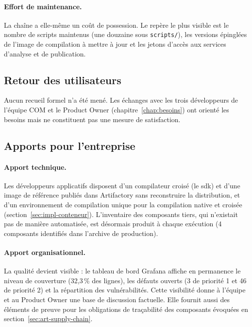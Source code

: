\paragraph{Effort de maintenance.} La chaîne a elle-même un coût de possession.
Le repère le plus visible est le nombre de scripts maintenus (une douzaine sous
\texttt{scripts/}), les versions épinglées de l'image de compilation à mettre
à jour et les jetons d'accès aux services d'analyse et de publication.

\subsection{Retour des utilisateurs}
\label{sec:eval-retour}

Aucun recueil formel n'a été mené. Les échanges avec les trois développeurs de
l'équipe COM et le Product Owner (chapitre~\ref{chap:besoins}) ont orienté les
besoins mais ne constituent pas une mesure de satisfaction.

\subsection{Apports pour l'entreprise}
\label{sec:eval-apports-entreprise}

\paragraph{Apport technique.} Les développeurs applicatifs disposent d'un
compilateur croisé (le \gls{sdk}) et d'une image de référence publiés dans
Artifactory sans reconstruire la distribution, et d'un environnement de
compilation unique pour la compilation native et croisée
(section~\ref{sec:impl-conteneur}). L'inventaire des composants tiers, qui
n'existait pas de manière automatisée, est désormais produit à chaque exécution
(4 composants identifiés dans l'archive de production).

\paragraph{Apport organisationnel.} La qualité devient visible : le tableau de
bord Grafana affiche en permanence le niveau de couverture (32,3\,\% des lignes),
les défauts ouverts (3 de priorité 1 et 46 de priorité 2) et la répartition des
vulnérabilités. Cette visibilité donne à l'équipe et au Product Owner une base
de discussion factuelle. Elle fournit aussi des éléments de preuve pour les
obligations de traçabilité des composants évoquées en
section~\ref{sec:art-supply-chain}.

